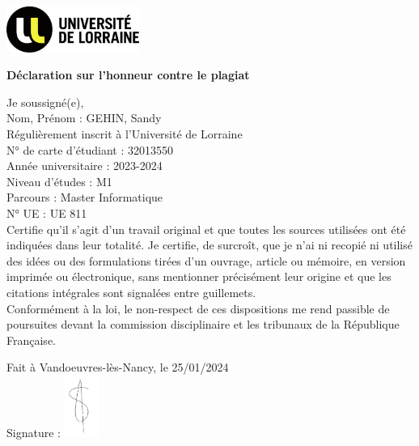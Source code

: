 \newpage
\thispagestyle{empty} %

\includegraphics[height=1.5cm]{images/univ_lorraine.png}
\begin{center}
    \normalsize\textbf{Déclaration sur l’honneur contre le plagiat}
\end{center}
\normalsize{Je soussigné(e),}\\[0.5cm]
\normalsize{Nom, Prénom : GEHIN, Sandy}\\[0.5cm]
\normalsize{Régulièrement inscrit à l’Université de Lorraine}\\
\normalsize{N° de carte d’étudiant : 32013550}\\
\normalsize{Année universitaire : 2023-2024}\\
\normalsize{Niveau d’études : M1}\\
\normalsize{Parcours : Master Informatique}\\
\normalsize{N° UE : UE 811}\\[0.5cm]
\normalsize{Certifie qu’il s’agit d’un travail original et que toutes les sources utilisées ont été indiquées dans leur totalité. Je certifie, de surcroît, que je n’ai ni recopié ni utilisé des idées ou des formulations tirées d’un ouvrage, article ou mémoire, en version imprimée ou électronique, sans mentionner précisément leur origine et que les citations intégrales sont signalées entre guillemets.}\\[0.5cm]
\normalsize{Conformément à la loi, le non-respect de ces dispositions me rend passible de poursuites    devant la commission disciplinaire et les tribunaux de la République Française.}
\\[1cm]

\begin{flushright}
    \normalsize{Fait à  Vandoeuvres-lès-Nancy, le 25/01/2024}\\[1cm]
    \normalsize{Signature :}
    \includegraphics[height=2cm]{images/signature_sandy.png}
\end{flushright}

\clearpage